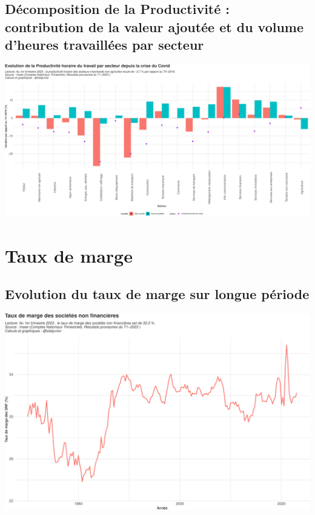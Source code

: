 \documentclass[
  paper=a4,
  ,captions=tableheading
]{scrartcl}
\begin{document}
\hypertarget{duxe9composition-de-la-productivituxe9-contribution-de-la-valeur-ajoutuxe9e-et-du-volume-dheures-travailluxe9es-par-secteur}{%
\subsection{Décomposition de la Productivité : contribution de la valeur
ajoutée et du volume d'heures travaillées par
secteur}\label{duxe9composition-de-la-productivituxe9-contribution-de-la-valeur-ajoutuxe9e-et-du-volume-dheures-travailluxe9es-par-secteur}}

\includegraphics{rapport_pdf_compte_branche_files/figure-latex/unnamed-chunk-20-1.pdf}

\newpage

\hypertarget{taux-de-marge}{%
\section{Taux de marge}\label{taux-de-marge}}

\hypertarget{evolution-du-taux-de-marge-sur-longue-puxe9riode}{%
\subsection{Evolution du taux de marge sur longue
période}\label{evolution-du-taux-de-marge-sur-longue-puxe9riode}}

\includegraphics{rapport_pdf_compte_branche_files/figure-latex/unnamed-chunk-21-1.pdf}
\end{document}
